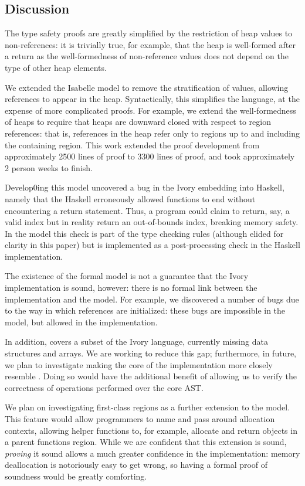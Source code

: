\subsection{Discussion}
\label{sec:sem-discuss}

The type safety proofs are greatly simplified by the restriction of
heap values to non-references: it is trivially true, for example, that
the heap is well-formed after a return as the well-formedness of
non-reference values does not depend on the type of other heap
elements.

We extended the Isabelle model to remove the stratification of values,
allowing references to appear in the heap.  Syntactically, this
simplifies the language, at the expense of more complicated proofs.
For example, we extend the well-formedness of heaps to require that
heaps are downward closed with respect to region references: that is,
references in the heap refer only to regions up to and including the
containing region.  This work extended the proof development from
approximately 2500 lines of proof to 3300 lines of proof, and took
approximately 2 person weeks to finish.

Develop0ing this model uncovered a bug in the Ivory embedding into
Haskell, namely that the Haskell erroneously allowed functions to
end without encountering a return statement.  Thus, a program could
claim to return, say, a valid index but in reality return an
out-of-bounds index, breaking memory safety.  In the model this
check is part of the type checking rules (although elided for clarity
in this paper) but is implemented as a post-processing check in the
Haskell implementation.  

The existence of the formal model is not a guarantee that the Ivory
implementation is sound, however: there is no formal link between the
implementation and the model.  For example, we discovered a number of
bugs due to the way in which references are initialized: these bugs
are impossible in the model, but allowed in the implementation.  

In addition, \coreivory{} covers a subset of the Ivory language,
currently missing data structures and arrays.  We are working to
reduce this gap; furthermore, in future, we plan to investigate making
the core of the implementation more closely resemble \coreivory{}.
Doing so would have the additional benefit of allowing us to verify
the correctness of operations performed over the core AST.

We plan on investigating first-class regions as a further extension to
the model.  This feature would allow programmers to name and pass
around allocation contexts, allowing helper functions to, for example,
allocate and return objects in a parent functions region.  While we
are confident that this extension is sound, \emph{proving} it sound
allows a much greater confidence in the implementation: memory
deallocation is notoriously easy to get wrong, so having a formal
proof of soundness would be greatly comforting. 


